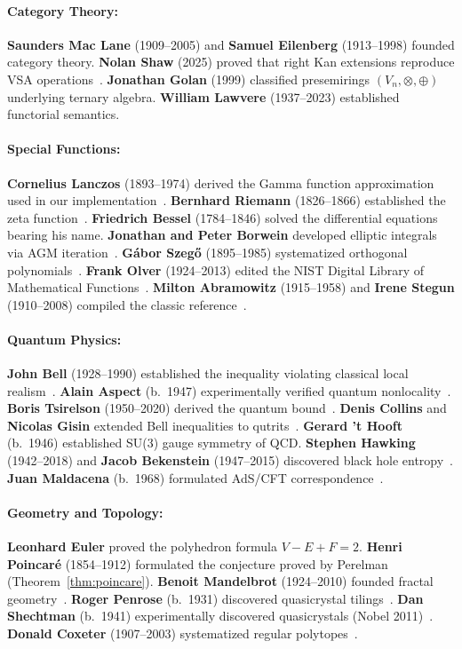 \documentclass[aps,prd,preprint,superscriptaddress,showpacs,nofootinbib,longbibliography]{revtex4-2}
\begin{document}
\paragraph{Category Theory:}
\textbf{Saunders Mac Lane} (1909--2005) and \textbf{Samuel Eilenberg} (1913--1998) founded category theory. \textbf{Nolan Shaw} (2025) proved that right Kan extensions reproduce VSA operations~\cite{shaw2025}. \textbf{Jonathan Golan} (1999) classified presemirings $(V_n, \otimes, \oplus)$ underlying ternary algebra. \textbf{William Lawvere} (1937--2023) established functorial semantics.

\paragraph{Special Functions:}
\textbf{Cornelius Lanczos} (1893--1974) derived the Gamma function approximation used in our implementation~\cite{lanczos1964}. \textbf{Bernhard Riemann} (1826--1866) established the zeta function~\cite{riemann1859}. \textbf{Friedrich Bessel} (1784--1846) solved the differential equations bearing his name. \textbf{Jonathan and Peter Borwein} developed elliptic integrals via AGM iteration~\cite{borwein1987}. \textbf{G\'abor Szeg\H{o}} (1895--1985) systematized orthogonal polynomials~\cite{szego1975}. \textbf{Frank Olver} (1924--2013) edited the NIST Digital Library of Mathematical Functions~\cite{olver2024}. \textbf{Milton Abramowitz} (1915--1958) and \textbf{Irene Stegun} (1910--2008) compiled the classic reference~\cite{abramowitz1964}.

\paragraph{Quantum Physics:}
\textbf{John Bell} (1928--1990) established the inequality violating classical local realism~\cite{bell1964}. \textbf{Alain Aspect} (b.~1947) experimentally verified quantum nonlocality~\cite{aspect1982}. \textbf{Boris Tsirelson} (1950--2020) derived the quantum bound~\cite{tsirelson1980}. \textbf{Denis Collins} and \textbf{Nicolas Gisin} extended Bell inequalities to qutrits~\cite{collins2002}. \textbf{Gerard 't Hooft} (b.~1946) established SU(3) gauge symmetry of QCD. \textbf{Stephen Hawking} (1942--2018) and \textbf{Jacob Bekenstein} (1947--2015) discovered black hole entropy~\cite{bekenstein1973,hawking1975}. \textbf{Juan Maldacena} (b.~1968) formulated AdS/CFT correspondence~\cite{maldacena1997}.

\paragraph{Geometry and Topology:}
\textbf{Leonhard Euler} proved the polyhedron formula $V - E + F = 2$. \textbf{Henri Poincar\'e} (1854--1912) formulated the conjecture proved by Perelman (Theorem~\ref{thm:poincare}). \textbf{Benoit Mandelbrot} (1924--2010) founded fractal geometry~\cite{mandelbrot1982}. \textbf{Roger Penrose} (b.~1931) discovered quasicrystal tilings~\cite{penrose1974}. \textbf{Dan Shechtman} (b.~1941) experimentally discovered quasicrystals (Nobel 2011)~\cite{shechtman1984}. \textbf{Donald Coxeter} (1907--2003) systematized regular polytopes~\cite{coxeter1973}.
\end{document}
